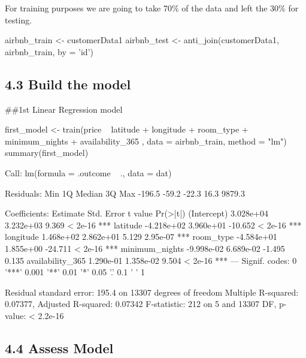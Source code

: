 For training purposes we are going to take 70\% of the data and left the
30\% for testing.

\begin{Schunk}
\begin{Sinput}
airbnb_train <- customerData1 %
airbnb_test  <- anti_join(customerData1, airbnb_train, by = 'id') %
\end{Sinput}
\end{Schunk}

\hypertarget{build-the-model}{%
\subsection{4.3 Build the model}\label{build-the-model}}

\#\#1st Linear Regression model

\begin{Schunk}
\begin{Sinput}
first_model <- train(price ~ latitude + longitude + room_type + minimum_nights  + availability_365 , data = airbnb_train, method = "lm")
summary(first_model)
\end{Sinput}
\begin{Soutput}

Call:
lm(formula = .outcome ~ ., data = dat)

Residuals:
   Min     1Q Median     3Q    Max 
-196.5  -59.2  -22.3   16.3 9879.3 

Coefficients:
                   Estimate Std. Error t value Pr(>|t|)    
(Intercept)       3.028e+04  3.232e+03   9.369  < 2e-16 ***
latitude         -4.218e+02  3.960e+01 -10.652  < 2e-16 ***
longitude         1.468e+02  2.862e+01   5.129 2.95e-07 ***
room_type        -4.584e+01  1.855e+00 -24.711  < 2e-16 ***
minimum_nights   -9.998e-02  6.689e-02  -1.495    0.135    
availability_365  1.290e-01  1.358e-02   9.504  < 2e-16 ***
---
Signif. codes:  0 '***' 0.001 '**' 0.01 '*' 0.05 '.' 0.1 ' ' 1

Residual standard error: 195.4 on 13307 degrees of freedom
Multiple R-squared:  0.07377,   Adjusted R-squared:  0.07342 
F-statistic:   212 on 5 and 13307 DF,  p-value: < 2.2e-16
\end{Soutput}
\end{Schunk}

\hypertarget{assess-model}{%
\subsection{4.4 Assess Model}\label{assess-model}}

